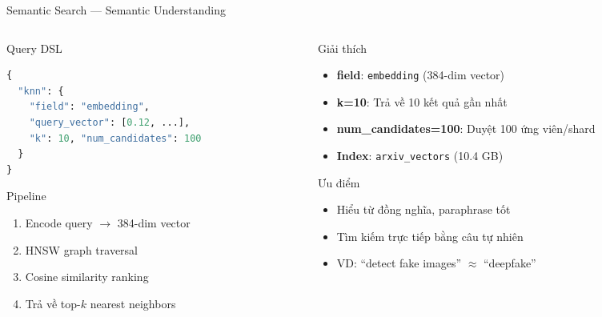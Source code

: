 \begin{frame}[fragile]{Semantic Search --- Semantic Understanding}
\begin{columns}[T]
\begin{column}{0.48\textwidth}

\begin{block}{Query DSL}
\begin{lstlisting}[language=Python]
{
  "knn": {
    "field": "embedding",
    "query_vector": [0.12, ...],
    "k": 10, "num_candidates": 100
  }
}
\end{lstlisting}
\end{block}

\vspace{-0.1cm}

\begin{block}{Pipeline}
{\scriptsize
\begin{enumerate}\itemsep0pt \parskip0pt 
    \item Encode query $\to$ 384-dim vector
    \item HNSW graph traversal
    \item Cosine similarity ranking
    \item Trả về top-$k$ nearest neighbors
\end{enumerate}
}
\end{block}

\end{column}
\begin{column}{0.48\textwidth}

\begin{block}{Giải thích}
{\scriptsize
\begin{itemize}\itemsep0pt \parskip0pt 
    \item \textbf{field}: \texttt{embedding} (384-dim vector)
    \item \textbf{k=10}: Trả về 10 kết quả gần nhất
    \item \textbf{num\_candidates=100}: Duyệt 100 ứng viên/shard
    \item \textbf{Index}: \texttt{arxiv\_vectors} (10.4 GB)
\end{itemize}
}
\end{block}

\vspace{-0.1cm}

\begin{exampleblock}{Ưu điểm}
{\scriptsize
\begin{itemize}\itemsep0pt \parskip0pt 
    \item Hiểu từ đồng nghĩa, paraphrase tốt
    \item Tìm kiếm trực tiếp bằng câu tự nhiên
    \item VD: ``detect fake images'' $\approx$ ``deepfake''
\end{itemize}
}
\end{exampleblock}

\end{column}
\end{columns}
\end{frame}


